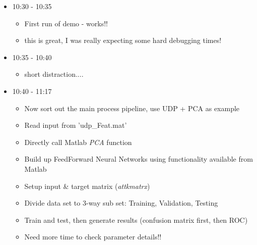 \documentclass[a4paper]{article}
\begin{document}
\begin{description}
\begin{itemize}
		\item 10:30 - 10:35
			\begin{itemize}
				\item First run of demo - works!! 
				\item this is great, I was really expecting some hard debugging times!
			\end{itemize}
		\item 10:35 - 10:40
			\begin{itemize}
				\item short distraction....
			\end{itemize}
		\item 10:40 - 11:17
			\begin{itemize}
				\item Now sort out the main process pipeline, use UDP + PCA as example
				\item Read input from 'udp\_Feat.mat'
				\item Directly call Matlab \textit{PCA} function
				\item Build up FeedForward Neural Networks using functionality available from Matlab
				\item Setup input \& target matrix (\textit{attkmatrx})
				\item Divide data set to 3-way sub set:  Training, Validation, Testing
				\item Train and test, then generate results (confusion matrix first, then ROC)
				\item Need more time to check parameter details!!
			\end{itemize}
	\end{itemize}
	
\end{description}





%
%
%
%
\end{document}
